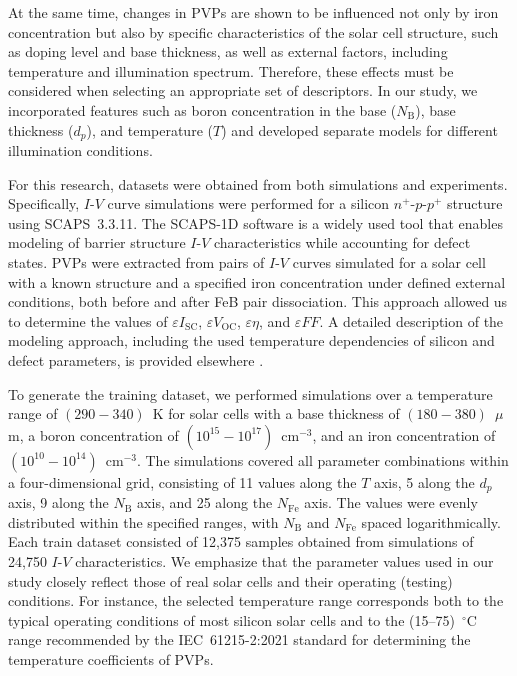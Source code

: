 \documentclass[a4paper,fleqn]{cas-sc}
\begin{document}
At the same time, changes in PVPs are shown \cite{FeB:Schmidt,Olikh2025MSEB} to be influenced not only by iron concentration
but also by specific characteristics of the solar cell structure, such as doping level and base thickness,
as well as external factors, including temperature and illumination spectrum.
Therefore, these effects must be considered when selecting an appropriate set of descriptors.
In our study, we incorporated features such as boron concentration in the base ($N_\mathrm{B}$), base thickness ($d_p$), and temperature ($T$)
and developed separate models for different illumination conditions.

For this research, datasets were obtained from both simulations and experiments.
Specifically, $I$-$V$ curve simulations were performed for a silicon $n^+$-$p$-$p^+$ structure using SCAPS~3.3.11.
The SCAPS-1D software \cite{SCAPS1} is a widely used tool
\cite{MasumMia2025, Joshi2024, Ravidas2024, Liu2024, You2023, SCAPSDefect3}
that enables modeling of barrier structure $I$-$V$ characteristics while accounting for defect states.
PVPs were extracted from pairs of $I$-$V$ curves simulated for a solar cell with a known structure
and a specified iron concentration under defined external conditions, both before and after FeB pair dissociation.
This approach allowed us to determine the values of $\varepsilon I_\mathrm{SC}$, $\varepsilon V_\mathrm{OC}$, $\varepsilon \eta$, and
$\varepsilon F\!F$.
A detailed description of the modeling approach, including the used temperature dependencies of silicon and defect parameters,
is provided elsewhere \cite{Olikh2025MSEB, Olikh2019SM}.


To generate the training dataset, we performed simulations over a temperature range of $(290-340)$~K
for solar cells with a base thickness of $(180-380)$~$\mu$m,
a boron concentration of $(10^{15} - 10^{17})$~cm$^{-3}$, and an iron concentration of $(10^{10}-10^{14})$~cm$^{-3}$.
The simulations covered all parameter combinations within a four-dimensional grid, consisting of 11 values along the $T$ axis,
5 along the $d_p$ axis,
9 along the $N_\mathrm{B}$ axis, and 25 along the $N_\mathrm{Fe}$ axis.
The values were evenly distributed within the specified ranges, with $N_\mathrm{B}$ and $N_\mathrm{Fe}$ spaced logarithmically.
Each train dataset consisted of 12,375 samples obtained from simulations of 24,750 $I$-$V$ characteristics.
We emphasize that the parameter values used in our study closely reflect those of real solar cells
and their operating (testing) conditions.
For instance, the selected temperature range corresponds both to the typical operating conditions of most silicon solar cells
and to the (15--75)~$^\circ$C range recommended by the IEC~61215-2:2021 standard for determining the temperature coefficients of PVPs.
\end{document}
